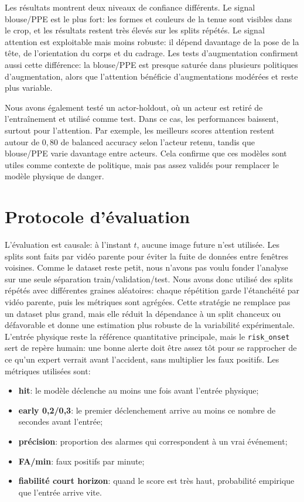 \documentclass[11pt]{article}
\begin{document}
Les résultats montrent deux niveaux de confiance différents. Le signal blouse/PPE est le plus fort: les formes et couleurs de la tenue sont visibles dans le crop, et les résultats restent très élevés sur les splits répétés. Le signal attention est exploitable mais moins robuste: il dépend davantage de la pose de la tête, de l'orientation du corps et du cadrage. Les tests d'augmentation confirment aussi cette différence: la blouse/PPE est presque saturée dans plusieurs politiques d'augmentation, alors que l'attention bénéficie d'augmentations modérées et reste plus variable.

Nous avons également testé un actor-holdout, où un acteur est retiré de l'entraînement et utilisé comme test. Dans ce cas, les performances baissent, surtout pour l'attention. Par exemple, les meilleurs scores attention restent autour de $0,80$ de balanced accuracy selon l'acteur retenu, tandis que blouse/PPE varie davantage entre acteurs. Cela confirme que ces modèles sont utiles comme contexte de politique, mais pas assez validés pour remplacer le modèle physique de danger.

\section{Protocole d'évaluation}
L'évaluation est causale: à l'instant $t$, aucune image future n'est utilisée. Les splits sont faits par vidéo parente pour éviter la fuite de données entre fenêtres voisines. Comme le dataset reste petit, nous n'avons pas voulu fonder l'analyse sur une seule séparation train/validation/test. Nous avons donc utilisé des splits répétés avec différentes graines aléatoires: chaque répétition garde l'étanchéité par vidéo parente, puis les métriques sont agrégées. Cette stratégie ne remplace pas un dataset plus grand, mais elle réduit la dépendance à un split chanceux ou défavorable et donne une estimation plus robuste de la variabilité expérimentale. L'entrée physique reste la référence quantitative principale, mais le \texttt{risk\_onset} sert de repère humain: une bonne alerte doit être assez tôt pour se rapprocher de ce qu'un expert verrait avant l'accident, sans multiplier les faux positifs. Les métriques utilisées sont:
\begin{itemize}[leftmargin=*]
\item \textbf{hit}: le modèle déclenche au moins une fois avant l'entrée physique;
\item \textbf{early 0,2/0,3}: le premier déclenchement arrive au moins ce nombre de secondes avant l'entrée;
\item \textbf{précision}: proportion des alarmes qui correspondent à un vrai événement;
\item \textbf{FA/min}: faux positifs par minute;
\item \textbf{fiabilité court horizon}: quand le score est très haut, probabilité empirique que l'entrée arrive vite.
\end{itemize}
\end{document}
